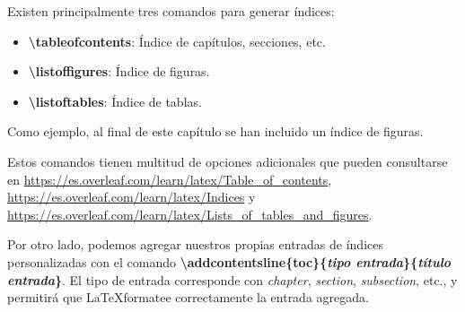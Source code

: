 Existen principalmente tres comandos para generar índices:

\begin{itemize}
	\item \textbf{\textbackslash tableofcontents}: Índice de capítulos, secciones, etc.
	\item \textbf{\textbackslash listoffigures}: Índice de figuras.
	\item \textbf{\textbackslash listoftables}: Índice de tablas.
\end{itemize}

Como ejemplo, al final de este capítulo se han incluido un índice de figuras.

Estos comandos tienen multitud de opciones adicionales que pueden consultarse en \url{https://es.overleaf.com/learn/latex/Table_of_contents}, \url{https://es.overleaf.com/learn/latex/Indices} y \url{https://es.overleaf.com/learn/latex/Lists_of_tables_and_figures}.

Por otro lado, podemos agregar nuestros propias entradas de índices personalizadas con el comando \textbf{\textbackslash addcontentsline\{toc\}\{\emph{tipo entrada}\}\{\emph{título entrada}\}}. El tipo de entrada corresponde con \emph{chapter}, \emph{section}, \emph{subsection}, etc., y permitirá que \LaTeX formatee correctamente la entrada agregada.

\listoffigures

